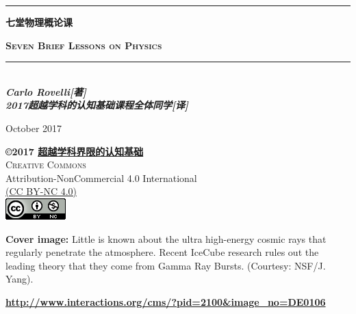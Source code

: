 	\AddToShipoutPicture*{\BackgroundPic}

	\begin{center}

		\vspace*{-2cm}
		\color{white}

		\hrule %

		\Huge{\textsc {\textbf{\youyuan 七堂物理概论课}}}

		\large{\textsc {\textbf{Seven Brief Lessons on Physics}}}
		\vspace*{2ex}

		\hrule %
		
		 
		\begin{large}
			\color{white}
			\textbf{
				\\
				\textit{
					Carlo Rovelli[著]\\
					2017超越学科的认知基础课程全体同学[译]
				}%
			}%

			\vfill

			October 2017
		\end{large}

		\vspace*{-3cm}

	\end{center}

	\newpage
	\thispagestyle{empty}
	\phantom{hola!}
		
	\null
	\vfill
	\bc
		\begin{minipage}{0.65\textwidth}
			{\sffamily
				\bc
					\textbf{\copyright 2017 \href{http://toyhouse.cc/wiki/index.php/Seven_Brief_Lessons_on_Physics}{\textbf{超越学科界限的认知基础}}}\\
					\textsc{Creative Commons}\\
					Attribution-NonCommercial 4.0 International\\
					\href{http://creativecommons.org/licenses/by-nc/4.0/legalcode}{(CC BY-NC 4.0)}\\[12pt]
					\includegraphics{img/license.png}\\[12pt]
				\ec
	
				\small\textbf{Cover image:} Little is known about the ultra high-energy cosmic rays that regularly penetrate the atmosphere. Recent IceCube research rules out the leading theory that they come from Gamma Ray Bursts. (Courtesy: NSF/J. Yang).
			}
		\end{minipage}\vspace*{1ex}
		\small\href{http://www.interactions.org/cms/?pid=2100&image_no=DE0106}{\textbf{\url{http://www.interactions.org/cms/?pid=2100&image_no=DE0106}}}
	\ec
